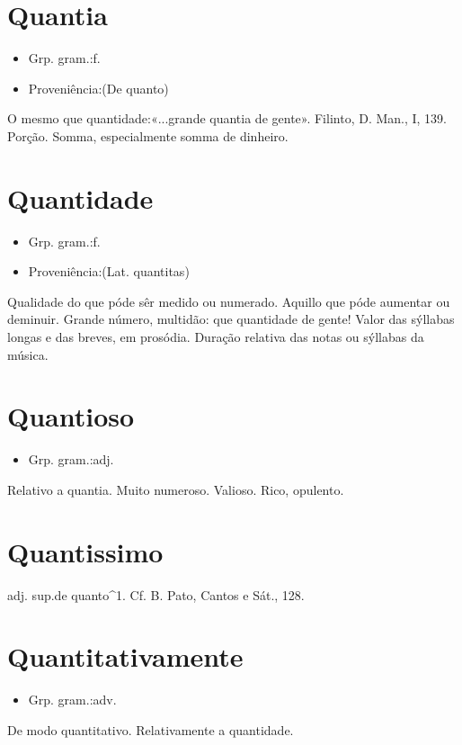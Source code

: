 \section{Quantia}
\begin{itemize}
\item {Grp. gram.:f.}
\end{itemize}
\begin{itemize}
\item {Proveniência:(De \textunderscore quanto\textunderscore )}
\end{itemize}
O mesmo que \textunderscore quantidade\textunderscore :«\textunderscore ...grande quantia de gente\textunderscore ». Filinto, \textunderscore D. Man.\textunderscore , I, 139.
Porção.
Somma, especialmente somma de dinheiro.
\section{Quantidade}
\begin{itemize}
\item {Grp. gram.:f.}
\end{itemize}
\begin{itemize}
\item {Proveniência:(Lat. \textunderscore quantitas\textunderscore )}
\end{itemize}
Qualidade do que póde sêr medido ou numerado.
Aquillo que póde aumentar ou deminuir.
Grande número, multidão: \textunderscore que quantidade de gente\textunderscore !
Valor das sýllabas longas e das breves, em prosódia.
Duração relativa das notas ou sýllabas da música.
\section{Quantioso}
\begin{itemize}
\item {Grp. gram.:adj.}
\end{itemize}
Relativo a quantia.
Muito numeroso.
Valioso.
Rico, opulento.
\section{Quantissimo}
\textunderscore adj. sup.\textunderscore  de \textunderscore quanto\textunderscore ^1. Cf. B. Pato, \textunderscore Cantos e Sát.\textunderscore , 128.
\section{Quantitativamente}
\begin{itemize}
\item {Grp. gram.:adv.}
\end{itemize}
De modo quantitativo.
Relativamente a quantidade.

